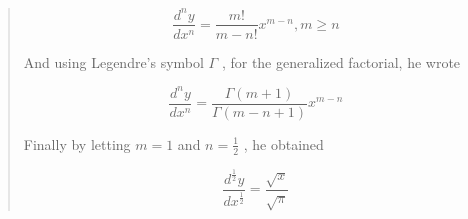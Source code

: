 \documentclass[a4paper,12pt]{article}
\begin{document}
\begin{quotation}
  



    \begin{equation}
      \frac{d^ny}{dx^n}  = \frac{m!}{m-n!} x^{m-n}  ,  m \geq n 
      \end{equation}    
     
  \begin{flushleft}
    And using Legendre’s symbol $\Gamma$ ,  for the generalized factorial, he wrote
  \end{flushleft}    

      
    \begin{equation}
      \frac{d^ny}{dx^n}  = \frac{\Gamma(m+1)}{\Gamma(m-n+1)} x^{m-n}  
      \end{equation}    
  
  \begin{flushleft}
    Finally by letting $m=1$ and $n=\frac{1}{2}$ , he obtained
  \end{flushleft}

  \begin{equation}
    \frac{d^{\frac{1}{2}}y}{dx^{\frac{1}{2}}}  = \frac{\sqrt{x}}{\sqrt{\pi}}   
    \end{equation}    


\end{quotation}
\end{document}
